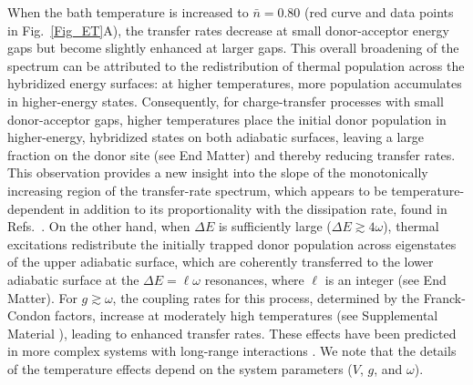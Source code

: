 \documentclass[
reprint,
superscriptaddress,

amsmath,amssymb,
aps,
prl,

floatfix,
]{revtex4-2}
\begin{document}
When the bath temperature is increased to $\bar{n}=0.80$ (red curve and data points in Fig.~\ref{Fig_ET}A), the transfer rates decrease at small donor-acceptor energy gaps but become slightly enhanced at larger gaps. This overall broadening of the spectrum can be attributed to the redistribution of thermal population across the hybridized energy surfaces: at higher temperatures, more population accumulates in higher-energy states. Consequently, for charge-transfer processes with small donor-acceptor gaps, higher temperatures place the initial donor population in higher-energy, hybridized states on both adiabatic surfaces, leaving a large fraction on the donor site (see End Matter) and thereby reducing transfer rates. This observation provides a new insight into the slope of the monotonically increasing region of the transfer-rate spectrum, which appears to be temperature-dependent in addition to its proportionality with the dissipation rate, found in Refs.~\cite{schlawin2021electrontransfer,so2024electrontransfer}. On the other hand, when $\Delta E$ is sufficiently large ($\Delta E\gtrsim4\omega$), thermal excitations redistribute the initially trapped donor population across eigenstates of the upper adiabatic surface, which are coherently transferred to the lower adiabatic surface at the $\Delta E=\ell\omega$ resonances, where $\ell$ is an integer (see End Matter). For $g\gtrsim\omega$, the coupling rates for this process, determined by the Franck-Condon factors, increase at moderately high temperatures (see Supplemental Material \cite{so2025fT_supp}), leading to enhanced transfer rates. These effects have been predicted in more complex systems with long-range interactions \cite{padilla2025delocalizedexcitationtransferopen}. We note that the details of the temperature effects depend on the system parameters ($V$, $g$, and $\omega$).
\end{document}
